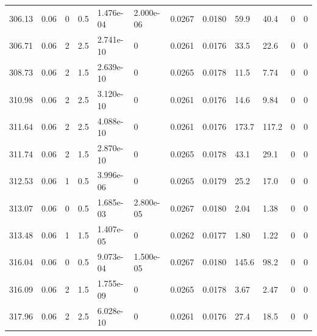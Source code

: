\documentclass[preview]{standalone}
\begin{document}
{{{{{\begin{tabular}{L{1.2cm}C{1.2cm} C{0.3cm}C{0.5cm} C{1.4cm}C{1.4cm} C{1.4cm}C{1.4cm} C{1.6cm}C{1.6cm} C{1.6cm}C{1.6cm}}
  306.13  &  0.06  & 0     & 0.5 &  1.476e-04  & 2.000e-06  &  0.0267&   0.0180& 59.9 & 40.4   &  0 & 0  \\ 
  306.71  &  0.06  & 2     & 2.5 &  2.741e-10  & 0  &  0.0261&   0.0176& 33.5 & 22.6   &  0 & 0  \\ 
  308.73  &  0.06  & 2     & 1.5 &  2.639e-10  & 0  &  0.0265&   0.0178& 11.5 & 7.74   &  0 & 0  \\ 
  310.98  &  0.06  & 2     & 2.5 &  3.120e-10  & 0  &  0.0261&   0.0176& 14.6 & 9.84   &  0 & 0  \\ 
  311.64  &  0.06  & 2     & 2.5 &  4.088e-10  & 0  &  0.0261&   0.0176& 173.7 & 117.2   &  0 & 0  \\ 
  311.74  &  0.06  & 2     & 1.5 &  2.870e-10  & 0  &  0.0265&   0.0178& 43.1 & 29.1   &  0 & 0  \\ 
  312.53  &  0.06  & 1     & 0.5 &  3.996e-06  & 0  &  0.0265&   0.0179& 25.2 & 17.0   &  0 & 0  \\ 
  313.07  &  0.06  & 0     & 0.5 &  1.685e-03  & 2.800e-05  &  0.0267&   0.0180& 2.04 & 1.38   &  0 & 0  \\ 
  313.48  &  0.06  & 1     & 1.5 &  1.407e-05  & 0  &  0.0262&   0.0177& 1.80 & 1.22   &  0 & 0  \\ 
  316.04  &  0.06  & 0     & 0.5 &  9.073e-04  & 1.500e-05  &  0.0267&   0.0180& 145.6 & 98.2   &  0 & 0  \\ 
  316.09  &  0.06  & 2     & 1.5 &  1.755e-09  & 0  &  0.0265&   0.0178& 3.67 & 2.47   &  0 & 0  \\ 
  317.96  &  0.06  & 2     & 2.5 &  6.028e-10  & 0  &  0.0261&   0.0176& 27.4 & 18.5   &  0 & 0  \\ 
\hline 
\end{tabular} 

}}}}}
\end{document}
